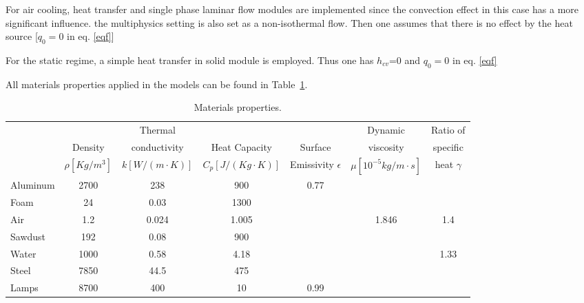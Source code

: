 For air cooling, heat transfer and single phase laminar flow modules are implemented since the convection effect in this case has a more significant influence. the multiphysics setting is also set as a non-isothermal flow. Then one assumes that there is no effect by the heat source [$ q_0=0 $ in eq. \ref{eqf}]

For the static regime, a simple heat transfer in solid module is employed. Thus one has $ h_{cv} $=0 and $ q_0=0 $ in eq. \ref{eqf}

All materials properties applied in the models can be found in Table~\ref{mat_pro}. 
 \begin{table}[ht]
    \centering
    \scriptsize
    \caption{Materials properties.}
 {\begin{tabular}{l|cccccc}
    \toprule
          & & Thermal & & & Dynamic & Ratio of \\
          & Density & conductivity & Heat Capacity & Surface & viscosity & specific\\
          & $\rho [Kg/m^3] $ & $k [W/(m\cdot K)] $ &$C_p [J/(Kg\cdot K)]$ &  Emissivity $\epsilon$ &$\mu [10^{-5}kg/m\cdot s]$ & heat $\gamma$ \\
     \midrule
   Aluminum     &2700   &238    &900 &0.77 & & \\
   Foam &24 &0.03   &1300 & & & \\
   Air  &1.2 &0.024 &1.005 & &1.846 &1.4 \\
   Sawdust  &192    &0.08   &900 & & & \\
   Water &1000  &0.58   &4.18 & & &1.33 \\
   Steel &7850  &44.5   &475 & & & \\
   Lamps &8700  &400    &10 &0.99 & & \\
     \bottomrule
 \end{tabular}}
 \label{mat_pro}
 \end{table}


